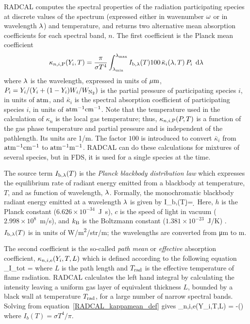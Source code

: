 RADCAL computes the spectral properties of the radiation participating species at discrete values of the spectrum (expressed either in wavenumber $\omega$ or in wavelength $\lambda$) and temperature,
and returns two alternative mean absorption coefficients for each spectral band, $n$. The first coefficient is the Planck mean coefficient \cite{Tien:1968}
\begin{equation}
\kappa_{n,i,{\rm P}}(Y_i,T) = \dfrac{\pi}{\sigma T^4}
\displaystyle\int_{\lambda_{\min}}^{\lambda_{\max}}{I_{\rm b,\lambda}(T)
100 \, \bar{\kappa}_i(\lambda,T) \, P_i \; \,\mathrm{d} \lambda}
\end{equation}
where $\lambda$ is the wavelength, expressed in units of ${\rm \mu m}$, $P_i=Y_i/(Y_i + (1-Y_i)W_i/W_{\rm N_2})$ is the partial pressure of participating species $i$, in units of ${\rm atm}$, and $\bar{\kappa}_i$ is the spectral absorption coefficient of participating species $i$, in units of ${\rm atm^{-1}cm^{-1}}$. Note that the temperature used in the calculation of $\kappa_n$ is the local gas temperature; thus, $\kappa_{n,i,{\rm P}}(P,T)$ is a function of the gas phase temperature and partial pressure and is independent of the pathlength. Its units are 1/m.
The factor $100$ is introduced to convert $\bar{\kappa}_i$ from ${\rm atm^{-1}cm^{-1}}$ to ${\rm atm^{-1}m^{-1}}$.
RADCAL can do these calculations for mixtures of several species, but in FDS, it is used for a single species at the time.

The source term $I_{\rm b,\lambda}(T)$ is the {\em Planck blackbody distribution law} which expresses the equilibrium rate of radiant energy emitted from a blackbody at temperature, $T$, and as function of wavelength, $\lambda$. Formally, the monochromatic blackbody radiant energy emitted at a wavelength $\lambda$ is given by \cite{Penner:1959}
\be \label{eq:Planck_law}
I_{\rm b,\la}(T)\d \la = \d \la
\ee
Here, $h$ is the Planck constant ($6.626 \times 10^{-34}$~\unit{J.s}), $c$ is the speed of light in vacuum ($2.998 \times 10^8$~m/s), and $k_{\rm B}$ is the Boltzmann constant ($1.381 \times 10^{-23}$~J/K) \cite{Mohr:2012}.
$I_{\rm b,\lambda}(T)$ is in units of \unit{W/m^2/str/m}; the wavelengths are converted from \unit{\micro m} to m.

The second coefficient is the so-called {\em path mean} or {\em effective} absorption coefficient, $\kappa_{n,i,{\rm e}}(Y_i,T,L)$ which is defined according to the following equation
\be
   _{I_{\rm tot}}
   = \frac{\sigma}{\pi}
    \label{RADCAL_kappamean_def}
\ee
where $L$ is the path length and $T_{\rm rad}$ is the effective temperature of flame radiation. RADCAL calculates the left hand integral by calculating the intensity leaving a uniform gas layer of equivalent thickness $L$, bounded by a black wall at temperature $T_{\rm rad}$, for a large number of narrow spectral bands. Solving from equation~\ref{RADCAL_kappamean_def} gives
\be
  \kappa_{n,i,{\rm e}}(Y_i,T,L) = -\ln\left(\right)
\ee
where $I_b(T) = \sigma T^4/\pi$.


